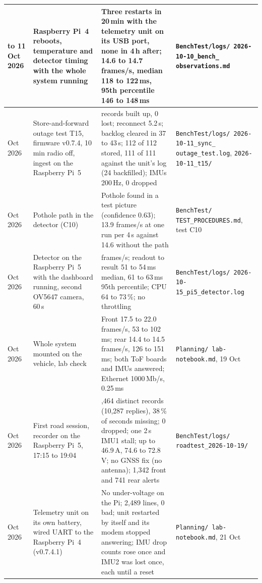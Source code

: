 \begin{longtable}{|>{\raggedright\arraybackslash}p{1.7cm}|>{\raggedright\arraybackslash}p{3.6cm}|>{\raggedright\arraybackslash}p{5.2cm}|>{\raggedright\arraybackslash}p{3.6cm}|}
10 to 11 Oct 2026 & Raspberry Pi~4 reboots, temperature and detector timing with the whole system running & Three restarts in 20\,min with the telemetry unit on its USB port, none in 4\,h after; 14.6 to 14.7 frames/s, median 118 to 122\,ms, 95th percentile 146 to 148\,ms & \texttt{BenchTest/\allowbreak{}logs/\allowbreak{} 2026-10-10\_\allowbreak{}bench\_\allowbreak{} observations.md} \\ \hline
11 Oct 2026 & Store-and-forward outage test T15, firmware v0.7.4, 10\,min radio off, ingest on the Raspberry Pi~5 & 60 records built up, 0 lost; reconnect 5.2\,s; backlog cleared in 37 to 43\,s; 112 of 112 stored, 111 of 111 against the unit's log (24 backfilled); IMUs 200\,Hz, 0 dropped & \texttt{BenchTest/\allowbreak{}logs/\allowbreak{} 2026-10-11\_\allowbreak{}sync\_\allowbreak{} outage\_\allowbreak{}test.log}, \texttt{2026-10-11\_t15/} \\ \hline
11 Oct 2026 & Pothole path in the detector (C10) & Pothole found in a test picture (confidence 0.63); 13.9 frames/s at one run per 4\,s against 14.6 without the path & \texttt{BenchTest/\allowbreak{} TEST\_\allowbreak{}PRO\allowbreak{}CEDURES.md}, test C10 \\ \hline
15 Oct 2026 & Detector on the Raspberry Pi~5 with the dashboard running, second OV5647 camera, 60\,s & 19.2 frames/s; readout to result 51 to 54\,ms median, 61 to 63\,ms 95th percentile; CPU 64 to 73\,\%; no throttling & \texttt{BenchTest/\allowbreak{}logs/\allowbreak{} 2026-10-15\_\allowbreak{}pi5\_\allowbreak{}detector.log} \\ \hline
19 Oct 2026 & Whole system mounted on the vehicle, lab check & Front 17.5 to 22.0 frames/s, 53 to 102\,ms; rear 14.4 to 14.5 frames/s, 126 to 151\,ms; both ToF boards and IMUs answered; Ethernet 1000\,Mb/s, 0.25\,ms & \texttt{Planning/\allowbreak{} lab-notebook.md}, 19 Oct \\ \hline
19 Oct 2026 & First road session, recorder on the Raspberry Pi~5, 17:15 to 19:04 & 3,464 distinct records (10,287 replies), 38\,\% of seconds missing; 0 dropped; one 2\,s IMU1 stall; up to 46.9\,A, 74.6 to 72.8\,V; no GNSS fix (no antenna); 1,342 front and 741 rear alerts & \texttt{BenchTest/\allowbreak{}logs/\allowbreak{} roadtest\_\allowbreak{}2026-10-19/} \\ \hline
21 Oct 2026 & Telemetry unit on its own battery, wired UART to the Raspberry Pi~4 (v0.7.4.1) & No under-voltage on the Pi; 2,489 lines, 0 bad; unit restarted by itself and its modem stopped answering; IMU drop counts rose once and IMU2 was lost once, each until a reset & \texttt{Planning/\allowbreak{} lab-notebook.md}, 21 Oct \\ \hline

\end{longtable}
